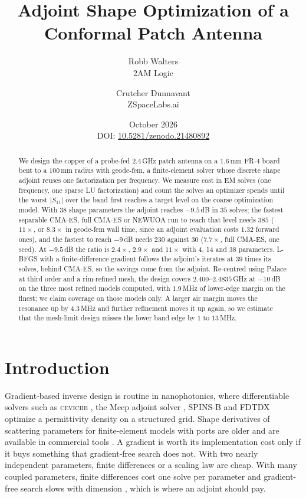 \documentclass{anvil-paper}
\title{Adjoint Shape Optimization of a Conformal Patch Antenna}
\author{Robb Walters\\
  {\normalsize 2AM Logic}
  \and Crutcher Dunnavant\\
  {\normalsize ZSpaceLabs.ai}}
\date{October 2026\\[0.5ex]
  {\normalsize DOI: \href{https://doi.org/10.5281/zenodo.21480892}{10.5281/zenodo.21480892}}}
\begin{document}
\maketitle

\begin{abstract}
We design the copper of a probe-fed 2.4\,GHz patch antenna on a $1.6$\,mm
FR-4 board bent to a $100$\,mm radius with geode-fem, a finite-element
solver whose discrete shape adjoint reuses one factorization per frequency.
We measure cost in EM solves (one frequency, one sparse LU factorization) and
count the solves an optimizer spends until the worst $|S_{11}|$ over the band
first reaches a target level on the coarse optimization model. With
38 shape parameters the adjoint reaches $-9.5$\,dB in $35$ solves; the fastest
separable CMA-ES, full CMA-ES or NEWUOA run to reach that level needs $385$
($11\times$, or $8.3\times$ in geode-fem wall time, since an adjoint
evaluation costs $1.32$ forward ones), and the fastest to reach $-9$\,dB needs
$230$ against $30$ ($7.7\times$, full CMA-ES, one seed). At $-9.5$\,dB the
ratio is $2.4\times$, $2.9\times$ and $11\times$ with 4, 14 and 38 parameters.
L-BFGS with a finite-difference gradient follows the adjoint's iterates at
$39$ times its solves, behind CMA-ES, so the savings come from the adjoint.
Re-centred using Palace at third order and a rim-refined mesh, the design
covers $2.400$--$2.4835$\,GHz at $-10$\,dB on the three most refined models
computed, with $1.9$\,MHz of lower-edge margin on the finest; we claim
coverage on those models only. A larger air margin moves the resonance up by
$4.3$\,MHz and further refinement moves it up again, so we estimate that the
mesh-limit design misses the lower band edge by $1$ to $13$\,MHz.
\end{abstract}

\section{Introduction}
\label{sec:intro}

Gradient-based inverse design is routine in nanophotonics, where
differentiable solvers such as \textsc{ceviche} \citep{hughes2019forward},
the Meep adjoint solver \citep{hammond2022meepadjoint}, SPINS-B
\citep{su_spinsb} and FDTDX \citep{mahlau2026fdtdx} optimize a permittivity
density on a structured grid. Shape derivatives of scattering parameters for
finite-element models with ports are older
\citep{webb2000design,georgieva2002feasible,nikolova2004adjoint} and are
available in commercial tools
\citep{ansys_hfss_derivatives,comsol_sensitivity_method}. A gradient is worth
its implementation cost only if it buys something that gradient-free search
does not. With two nearly independent parameters, finite differences or a
scaling law are cheap. With many coupled parameters, finite differences cost
one solve per parameter and gradient-free search slows with dimension
\citep{rios2013derivative}, which is where an adjoint should pay.
\end{document}
